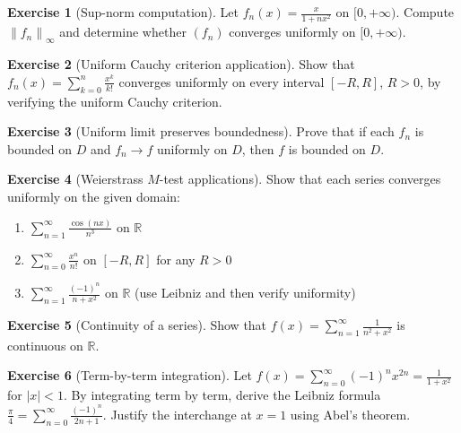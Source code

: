 \documentclass[12pt,a4paper]{book}
\theoremstyle{definition}
\newtheorem{exercise}{Exercise}[chapter]
\newcommand{\R}{\mathbb{R}}
\newcommand{\abs}[1]{\left\lvert #1 \right\rvert}
\newcommand{\norm}[1]{\left\lVert #1 \right\rVert}
\begin{document}
\begin{exercise}[Sup-norm computation]\label{exo:exer-sup-norm}
  Let $f_n(x)=\frac{x}{1+nx^2}$ on $[0,+\infty)$.  Compute
  $\norm{f_n}_\infty$ and determine whether $(f_n)$ converges uniformly
  on $[0,+\infty)$.
\end{exercise}

\begin{exercise}[Uniform Cauchy criterion application]\label{exo:exer-cauchy-apply}
  Show that $f_n(x)=\sum_{k=0}^n\frac{x^k}{k!}$ converges uniformly on
  every interval $[-R,R]$, $R>0$, by verifying the uniform Cauchy
  criterion.
\end{exercise}

\begin{exercise}[Uniform limit preserves boundedness]\label{exo:exer-bdd}
  Prove that if each $f_n$ is bounded on $D$ and $f_n\to f$ uniformly
  on $D$, then $f$ is bounded on $D$.
\end{exercise}

\begin{exercise}[Weierstrass $M$-test applications]\label{exo:exer-M-test}
  Show that each series converges uniformly on the given domain:
  \begin{enumerate}[label=(\alph*)]
    \item $\displaystyle\sum_{n=1}^{\infty}\frac{\cos(nx)}{n^3}$ on $\R$
    \item $\displaystyle\sum_{n=0}^{\infty}\frac{x^n}{n!}$ on $[-R,R]$
      for any $R>0$
    \item $\displaystyle\sum_{n=1}^{\infty}\frac{(-1)^n}{n+x^2}$ on $\R$
      (use Leibniz and then verify uniformity)
  \end{enumerate}
\end{exercise}

\begin{exercise}[Continuity of a series]\label{exo:exer-series-cont}
  Show that $\displaystyle f(x)=\sum_{n=1}^{\infty}\frac{1}{n^2+x^2}$
  is continuous on $\R$.
\end{exercise}

\begin{exercise}[Term-by-term integration]\label{exo:exer-termwise-int}
  Let $f(x)=\sum_{n=0}^{\infty}(-1)^n x^{2n}=\frac{1}{1+x^2}$ for
  $\abs{x}<1$.  By integrating term by term, derive the Leibniz formula
  $\displaystyle\frac{\pi}{4}=\sum_{n=0}^{\infty}\frac{(-1)^n}{2n+1}$.
  Justify the interchange at $x=1$ using Abel's theorem.
\end{exercise}
\end{document}
